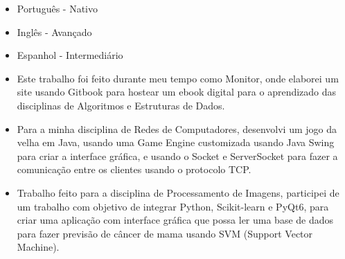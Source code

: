 \begin{itemize}
    \setlength\itemsep{1em}
    \item Português - Nativo 
    \item Inglês \hspace{16pt}- Avançado
    \item Espanhol \hspace{1pt} - Intermediário
\end{itemize}







\begin{itemize}
\item Este trabalho foi feito durante meu tempo como Monitor, onde elaborei um site usando Gitbook para hostear um ebook digital para o aprendizado das disciplinas de Algoritmos e Estruturas de Dados.
\end{itemize}
\smallskip
{}
\begin{itemize}
\item Para a minha disciplina de Redes de Computadores, desenvolvi um jogo da velha em Java, usando uma Game Engine customizada usando 
Java Swing para criar a interface gráfica, e usando o Socket e ServerSocket para fazer a comunicação entre os clientes usando o protocolo TCP.
\end{itemize}
\smallskip
{}
\begin{itemize}
\item Trabalho feito para a disciplina de Processamento de Imagens, participei de um trabalho com objetivo
de integrar Python, Scikit-learn e PyQt6, para criar uma aplicação com interface gráfica que possa ler uma base de dados 
para fazer previsão de câncer de mama usando SVM (Support Vector Machine).
\end{itemize}
\smallskip

